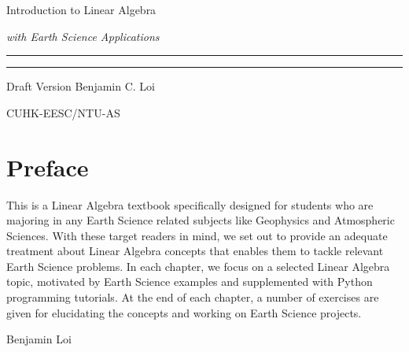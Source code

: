 \begin{titlepage}
    {\Huge\raggedright Introduction to Linear Algebra \par}
    {\Large\raggedright \textit{with Earth Science Applications} \hfill\textcolor{Mahogany}{\rule{3mm}{3mm}} \par}
    \vspace{3mm}\hrule\par
    {\Large\raggedleft Draft Version \hfill Benjamin C. Loi \par}
    \vfill
    {\Large\raggedleft CUHK-EESC/NTU-AS \par}
\end{titlepage}

\chapter*{Preface}
This is a Linear Algebra textbook specifically designed for students who are majoring in any Earth Science related subjects like Geophysics and Atmospheric Sciences. With these target readers in mind, we set out to provide an adequate treatment about Linear Algebra concepts that enables them to tackle relevant Earth Science problems. In each chapter, we focus on a selected Linear Algebra topic, motivated by Earth Science examples and supplemented with Python programming tutorials. At the end of each chapter, a number of exercises are given for elucidating the concepts and working on Earth Science projects. \par
{\raggedleft Benjamin Loi \par}

\tableofcontents